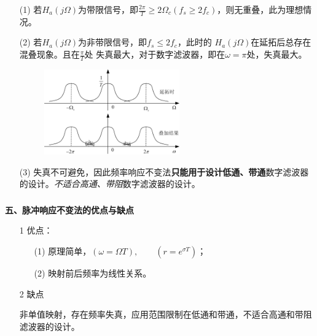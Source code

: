\documentclass[notheorems,compress,mathserif,table]{beamer}
\begin{document}
\begin{frame}[allowframebreaks]
\begin{enumerate}
  \begin{enumerate}
    \item [(1)]
        若$H_a(j\Omega)$为带限信号，即$\frac{2\pi}{T}\geqslant 2\Omega_c(f_s\geqslant2f_c)$，则无重叠，此为理想情况。
    \item [(2)]
        若$H_a(j\Omega)$为非带限信号，即$f_s\leqslant2f_c$，此时的
        $H_a(j\Omega)$在延拓后总存在混叠现象。且在$\frac{\pi}{T}$处
        失真最大，对于数字滤波器，即在$\omega=\pi$处，失真最大。
        \begin{figure}[h]
           \centering
           \includegraphics[width=0.55\textwidth]{fig17_MZdiejiajieguo.jpg}
        \end{figure}

    \item [(3)]
        失真不可避免，因此频率响应不变法\textbf{只能用于设计低通、带通}数字滤波器的设计。\emph{不适合高通、带阻}数字滤波器的设计。
  \end{enumerate}
\end{enumerate}
\end{frame}
%
%
\begin{frame}\frametitle{}%
\textbf{五、脉冲响应不变法的优点与缺点}
\begin{enumerate}
  \item [1] 优点：

      \begin{enumerate}
        \item [(1)] 原理简单，${(\omega=\Omega T),\quad\quad(r=e^{\sigma T})}$；
        \item [(2)] 映射前后频率为线性关系。
      \end{enumerate}
  \item [2] 缺点

      非单值映射，存在频率失真，应用范围限制在低通和带通，不适合高通和带阻
      滤波器的设计。
\end{enumerate}
\end{frame}
\end{document}
